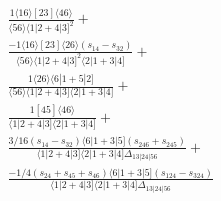 \documentclass[varwidth, border=5pt]{standalone}
\begin{document}
\begin{my}
$\begin{gathered}
\scriptscriptstyle\frac{1⟨16⟩[23]⟨46⟩}{⟨56⟩⟨1|2+4|3]^2}+\\
\scriptscriptstyle\frac{-1⟨16⟩[23]⟨26⟩(s_{14}-s_{32})}{⟨56⟩⟨1|2+4|3]^2⟨2|1+3|4]}+\\
\scriptscriptstyle\frac{1⟨26⟩⟨6|1+5|2]}{⟨56⟩⟨1|2+4|3]⟨2|1+3|4]}+\\
\scriptscriptstyle\frac{1[45]⟨46⟩}{⟨1|2+4|3]⟨2|1+3|4]}+\\
\scriptscriptstyle\frac{3/16(s_{14}-s_{32})⟨6|1+3|5](s_{246}+s_{245})}{⟨1|2+4|3]⟨2|1+3|4]Δ_{13|24|56}}+\\
\scriptscriptstyle\frac{-1/4(s_{24}+s_{45}+s_{46})⟨6|1+3|5](s_{124}-s_{324})}{⟨1|2+4|3]⟨2|1+3|4]Δ_{13|24|56}}\phantom{+}
\end{gathered}$
\end{my}
\end{document}

